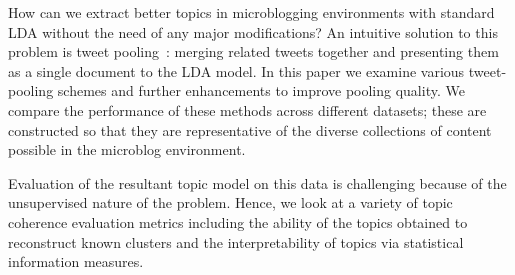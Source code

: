 \documentclass[10pt,a5paper,twoside]{article}
\begin{document}
How can we extract better topics in
microblogging environments with standard LDA without the need of any
major modifications?  An intuitive solution to this problem is tweet
pooling~\cite{Weng2010wsdm,hong}: merging related tweets together and presenting them as a
single document to the LDA model.  
In this paper we examine various tweet-pooling schemes and further 
enhancements to improve pooling quality.  We compare
the performance of these methods across different datasets; these are
constructed so that they are representative of the diverse collections
of content possible in the microblog environment.  

Evaluation of the resultant topic model on this data is challenging
because of the unsupervised nature of the problem.  Hence, we look at
a variety of topic coherence evaluation metrics including the ability
of the topics obtained to reconstruct known clusters and
the interpretability of topics via statistical information measures.

%
\end{document}
